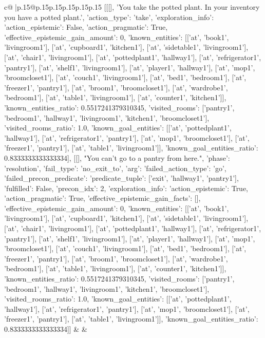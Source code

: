 \documentclass{article}
\begin{document}
{\begin{supertabular}{c@{$\;$}|p{.15\linewidth}@{}p{.15\linewidth}p{.15\linewidth}p{.15\linewidth}p{.15\linewidth}p{.15\linewidth}}
{{{	 [[[], 'You take the potted plant. In your inventory you have a potted plant.', {'action_type': 'take', 'exploration_info': {'action_epistemic': False, 'action_pragmatic': True, 'effective_epistemic_gain_amount': 0, 'known_entities': [['at', 'book1', 'livingroom1'], ['at', 'cupboard1', 'kitchen1'], ['at', 'sidetable1', 'livingroom1'], ['at', 'chair1', 'livingroom1'], ['at', 'pottedplant1', 'hallway1'], ['at', 'refrigerator1', 'pantry1'], ['at', 'shelf1', 'livingroom1'], ['at', 'player1', 'hallway1'], ['at', 'mop1', 'broomcloset1'], ['at', 'couch1', 'livingroom1'], ['at', 'bed1', 'bedroom1'], ['at', 'freezer1', 'pantry1'], ['at', 'broom1', 'broomcloset1'], ['at', 'wardrobe1', 'bedroom1'], ['at', 'table1', 'livingroom1'], ['at', 'counter1', 'kitchen1']], 'known_entities_ratio': 0.5517241379310345, 'visited_rooms': ['pantry1', 'bedroom1', 'hallway1', 'livingroom1', 'kitchen1', 'broomcloset1'], 'visited_rooms_ratio': 1.0, 'known_goal_entities': [['at', 'pottedplant1', 'hallway1'], ['at', 'refrigerator1', 'pantry1'], ['at', 'mop1', 'broomcloset1'], ['at', 'freezer1', 'pantry1'], ['at', 'table1', 'livingroom1']], 'known_goal_entities_ratio': 0.8333333333333334}}], [[], "You can't go to a pantry from here.", {'phase': 'resolution', 'fail_type': 'no_exit_to', 'arg': {'failed_action_type': 'go', 'failed_precon_predicate': {'predicate_tuple': ['exit', 'hallway1', 'pantry1'], 'fulfilled': False, 'precon_idx': 2}}, 'exploration_info': {'action_epistemic': True, 'action_pragmatic': True, 'effective_epistemic_gain_facts': [], 'effective_epistemic_gain_amount': 0, 'known_entities': [['at', 'book1', 'livingroom1'], ['at', 'cupboard1', 'kitchen1'], ['at', 'sidetable1', 'livingroom1'], ['at', 'chair1', 'livingroom1'], ['at', 'pottedplant1', 'hallway1'], ['at', 'refrigerator1', 'pantry1'], ['at', 'shelf1', 'livingroom1'], ['at', 'player1', 'hallway1'], ['at', 'mop1', 'broomcloset1'], ['at', 'couch1', 'livingroom1'], ['at', 'bed1', 'bedroom1'], ['at', 'freezer1', 'pantry1'], ['at', 'broom1', 'broomcloset1'], ['at', 'wardrobe1', 'bedroom1'], ['at', 'table1', 'livingroom1'], ['at', 'counter1', 'kitchen1']], 'known_entities_ratio': 0.5517241379310345, 'visited_rooms': ['pantry1', 'bedroom1', 'hallway1', 'livingroom1', 'kitchen1', 'broomcloset1'], 'visited_rooms_ratio': 1.0, 'known_goal_entities': [['at', 'pottedplant1', 'hallway1'], ['at', 'refrigerator1', 'pantry1'], ['at', 'mop1', 'broomcloset1'], ['at', 'freezer1', 'pantry1'], ['at', 'table1', 'livingroom1']], 'known_goal_entities_ratio': 0.8333333333333334}}]] 
	  } 
	   } 
	   } 
	 & & \\ 
 


\end{supertabular}}
\end{document}
